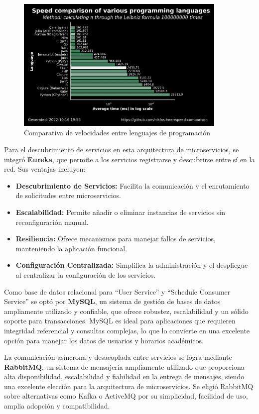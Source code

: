 \begin{figure}[H]
    \centering
    \includegraphics[width=0.9\textwidth]{figures/06_comp.png}
    \caption{Comparativa de velocidades entre lenguajes de programación}
    \label{fig:programming_languages_speed}
\end{figure}

Para el descubrimiento de servicios en esta arquitectura de microservicios, se integró \textbf{Eureka}, que permite a los servicios registrarse y descubrirse entre sí en la red. Sus ventajas incluyen:
\begin{itemize}
    \item \textbf{Descubrimiento de Servicios:} Facilita la comunicación y el enrutamiento de solicitudes entre microservicios.
    \item \textbf{Escalabilidad:} Permite añadir o eliminar instancias de servicios sin reconfiguración manual.
    \item \textbf{Resiliencia:} Ofrece mecanismos para manejar fallos de servicios, manteniendo la aplicación funcional.
    \item \textbf{Configuración Centralizada:} Simplifica la administración y el despliegue al centralizar la configuración de los servicios.
\end{itemize}

Como base de datos relacional para ``User Service'' y ``Schedule Consumer Service'' se optó por \textbf{MySQL}, un sistema de gestión de bases de datos ampliamente utilizado y confiable, que ofrece robustez, escalabilidad y un sólido soporte para transacciones. MySQL es ideal para aplicaciones que requieren integridad referencial y consultas complejas, lo que lo convierte en una excelente opción para manejar los datos de usuarios y horarios académicos.

La comunicación asíncrona y desacoplada entre servicios se logra mediante \textbf{RabbitMQ}, un sistema de mensajería ampliamente utilizado que proporciona alta disponibilidad, escalabilidad y fiabilidad en la entrega de mensajes, siendo una excelente elección para la arquitectura de microservicios. Se eligió RabbitMQ sobre alternativas como Kafka o ActiveMQ por su simplicidad, facilidad de uso, amplia adopción y compatibilidad.

